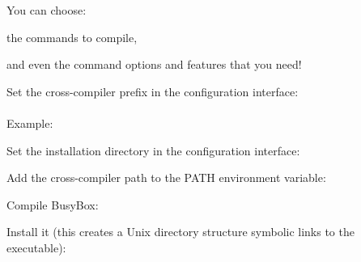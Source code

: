     You can choose:
    \startitemize
    \item the commands to compile,
    \item and even the command options and features that you need!
    \stopitemize


  \startitemize
  \item Set the cross-compiler prefix in the configuration interface: \\
    \\
    Example: 
  \item Set the installation directory in the configuration interface: \\
  \item Add the cross-compiler path to the PATH environment variable:\\
  \item Compile BusyBox:\\
  \item Install it (this creates a Unix directory structure symbolic
    links to the  executable):\\
  \stopitemize

